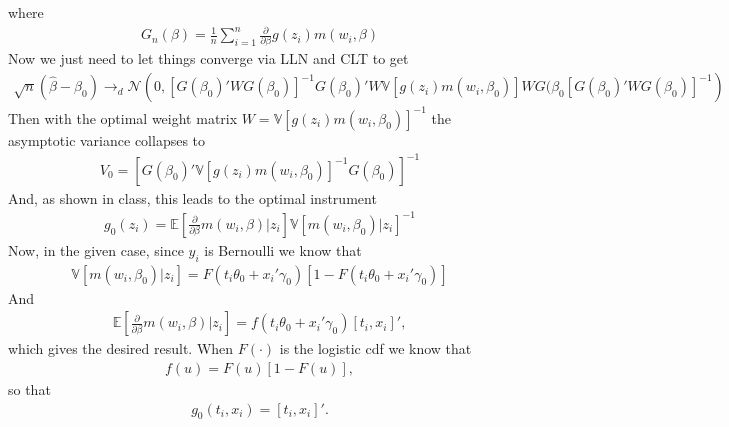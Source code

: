 \documentclass[12pt]{article}
\newcommand{\E}{\mathbb{E}}
\newcommand{\V}{\mathbb{V}}
\newcommand{\mtx}[1]{\ensuremath{\bm{\mathit{#1}}}}
\newcommand{\N}{\mathcal{N}}
\begin{document}
where
\begin{align*}
\mtx{G}_n({\mtx{\beta}}) = \frac{1}{n}\sum_{i=1}^n \frac{\partial}{\partial \beta}\mtx{g}(\mtx{z}_i)m(\mtx{w}_i,\mtx{\beta})
\end{align*}
Now we just need to let things converge via LLN and CLT to get
\begin{align*}
\sqrt{n}(\hat{\mtx{\beta}} - \mtx{\beta}_0)  \to_d \N\left(0, \left[\mtx{G}({\mtx{\beta}_0})'\mtx{W}\mtx{G}({\mtx{\beta}_0})\right]^{-1}\mtx{G}({\mtx{\beta}_0})'\mtx{W}\V[\mtx{g}(\mtx{z}_i)m(\mtx{w}_i,\mtx{\beta}_0)] \mtx{W}\mtx{G}({\mtx{\beta}_0} \left[\mtx{G}({\mtx{\beta}_0})'\mtx{W}\mtx{G}({\mtx{\beta}_0})\right]^{-1}\right)
\end{align*}
Then with the optimal weight matrix $\mtx{W} = \V[\mtx{g}(\mtx{z}_i)m(\mtx{w}_i,\mtx{\beta}_0)]^{-1}$ the asymptotic variance collapses to
\begin{align*}
\mtx{V}_0 = \left[\mtx{G}({\mtx{\beta}_0})'\V[\mtx{g}(\mtx{z}_i)m(\mtx{w}_i,\mtx{\beta}_0)]^{-1}\mtx{G}({\mtx{\beta}_0})\right]^{-1}
\end{align*}
And, as shown in class, this leads to the optimal instrument
\begin{align*}
\mtx{g}_0(\mtx{z}_i) =\E\left[\frac{\partial}{\partial \beta}m(\mtx{w}_i,\mtx{\beta})| \mtx{z}_i\right] \V[m(\mtx{w}_i,\mtx{\beta}_0)|\mtx{z}_i]^{-1}
\end{align*}
Now, in the given case, since $y_i$ is Bernoulli we know that
\begin{align*}
\V[m(\mtx{w}_i,\mtx{\beta}_0)|\mtx{z}_i] = F(t_i\theta_0 +\mtx{x}_i'\mtx{\gamma}_0)[1-F(t_i\theta_0 +\mtx{x}_i'\mtx{\gamma}_0)]
\end{align*}
And
\begin{align*}
\E\left[\frac{\partial}{\partial \beta}m(\mtx{w}_i,\mtx{\beta})| \mtx{z}_i\right] = f(t_i\theta_0 +\mtx{x}_i'\mtx{\gamma}_0)[t_i , \mtx{x}_i]',
\end{align*}
which gives the desired result. When $F(\cdot)$ is the logistic cdf we know that
\begin{align*}
f(u) = F(u)[1-F(u)],
\end{align*}
so that
\begin{align*}
\mtx{g}_0(t_i,\mtx{x}_i) = [t_i , \mtx{x}_i]'.
\end{align*}
\end{document}
